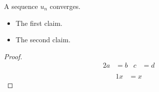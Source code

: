 \begin{theorem}\label{sequenceCriterion} A sequence $u_{n}$ converges.

\begin{itemize}\item The first claim. \item The second claim.\end{itemize}\end{theorem}

\begin{proof}\begin{alignat}{2}a&=b&c&=d\\\end{alignat} \begin{alignat*}{1}x&=x\end{alignat*}\end{proof}